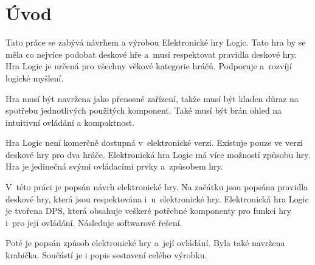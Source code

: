 \chapter*{Úvod}
{}

Tato práce se zabývá návrhem a výrobou Elektronické hry Logic. Tato hra by se měla co nejvíce podobat deskové hře a~musí respektovat pravidla deskové 
hry. Hra Logic je určená pro všechny věkové kategorie hráčů. Podporuje a~rozvíjí logické myšlení. 

Hra musí být navržena jako přenosné zařízení, takže musí být kladen důraz na spotřebu jednotlivých použitých komponent. Také musí být brán ohled na 
intuitivní ovládání a kompaktnost.

Hra Logic není komerčně dostupná v~elektronické verzi. Existuje pouze ve verzi deskové hry pro dva hráče. Elektronická hra Logic má více možností
způsobu hry. Hra je jedinečná svými ovládacími prvky a~způsobem hry. 

V~této práci je popsán návrh elektronické hry. Na začátku jsou popsána pravidla deskové hry, která jsou respektována i~u~elektronické hry. 
Elektronická hra Logic je tvořena DPS, která obsahuje veškeré potřebné komponenty pro funkci hry i~pro její ovládání. Následuje softwarové řešení.

Poté je popsán způsob elektronické hry a~její ovládání. Byla také navržena krabička. Součástí je i popis sestavení celého výrobku. 




